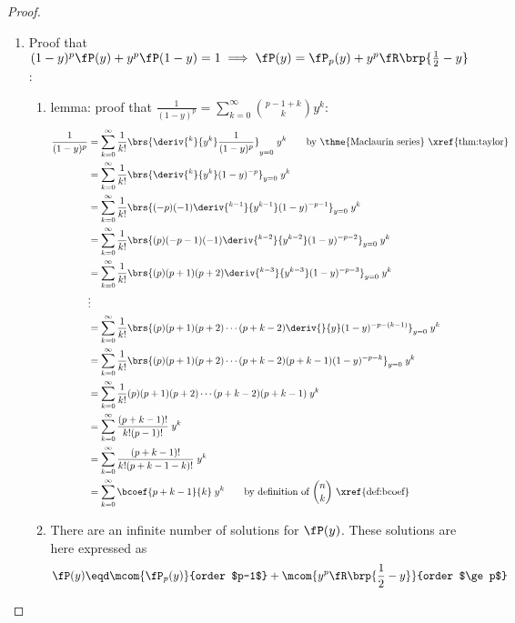 \begin{proof}
  \begin{enumerate}
    \item Proof that
      $(1-y)^p \fP(y) + y^p \fP(1-y) = 1 \implies \fP(y)=\fP_p(y) + y^p \fR\brp{\frac{1}{2}-y}$:
      \begin{enumerate}
        \item lemma: proof that
          $\frac{1}{(1-y)^p}=\sum_{k=0}^{\infty} {p-1+k \choose k} y^k$:
          \label{item:gcd_yp_1yp}
          \begin{align*}
            \frac{1}{(1-y)^p}
              &= \sum_{k=0}^{\infty} \frac{1}{k!}
                 \brs{\deriv{^k}{y^k}\frac{1}{(1-y)^p}}_{y=0} \; y^k
               \qquad\text{by \thme{Maclaurin series} \xref{thm:taylor}}
            \\&= \sum_{k=0}^{\infty} \frac{1}{k!}
                 \brs{\deriv{^k}{y^k}(1-y)^{-p}}_{y=0} \; y^k
            \\&= \sum_{k=0}^{\infty} \frac{1}{k!}
                 \brs{(-p)(-1)\deriv{^{k-1}}{y^{k-1}}(1-y)^{-p-1}}_{y=0} \; y^k
            \\&= \sum_{k=0}^{\infty} \frac{1}{k!}
                 \brs{(p)(-p-1)(-1)\deriv{^{k-2}}{y^{k-2}}(1-y)^{-p-2}}_{y=0} \; y^k
            \\&= \sum_{k=0}^{\infty} \frac{1}{k!}
                 \brs{(p)(p+1)(p+2)\deriv{^{k-3}}{y^{k-3}}(1-y)^{-p-3}}_{y=0} \; y^k
            \\&\vdots
            \\&= \sum_{k=0}^{\infty} \frac{1}{k!}
                 \brs{(p)(p+1)(p+2)\cdots(p+k-2)\deriv{}{y}(1-y)^{-p-(k-1)}}_{y=0} \; y^k
            \\&= \sum_{k=0}^{\infty} \frac{1}{k!}
                 \brs{(p)(p+1)(p+2)\cdots(p+k-2)(p+k-1)(1-y)^{-p-k}}_{y=0} \; y^k
            \\&= \sum_{k=0}^{\infty} \frac{1}{k!}
                 (p)(p+1)(p+2)\cdots(p+k-2)(p+k-1) \; y^k
            \\&= \sum_{k=0}^{\infty} \frac{(p+k-1)!}{k!(p-1)!} \; y^k
            \\&= \sum_{k=0}^{\infty} \frac{(p+k-1)!}{k!(p+k-1-k)!} \; y^k
            \\&= \sum_{k=0}^{\infty} \bcoef{p+k-1}{k} \; y^k
                 \qquad\text{by definition of ${n \choose k}$ \xref{def:bcoef}}
          \end{align*}

        \item There are an infinite number of solutions for $\fP(y)$.
              These solutions are here expressed as
              \[ \fP(y)
                   \eqd \mcom{\fP_p(y)}{order $p-1$}
                   +    \mcom{y^p \fR\brp{\frac{1}{2}-y}}{order $\ge p$}
              \]


\end{enumerate}
\end{enumerate}
\end{proof}
